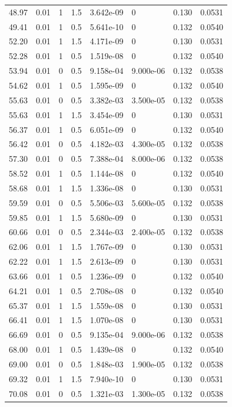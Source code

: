 \documentclass[preview]{standalone}
\begin{document}
{{{\begin{tabular}{L{1.2cm}C{1.2cm} C{0.3cm}C{0.5cm} C{1.4cm}C{1.4cm} C{1.4cm}C{1.4cm}}
  48.97  &  0.01  & 1     & 1.5 &  3.642e-09  & 0  & 0.130 &  0.0531   \\ 
  49.41  &  0.01  & 1     & 0.5 &  5.641e-10  & 0  & 0.132 &  0.0540   \\ 
  52.20  &  0.01  & 1     & 1.5 &  4.171e-09  & 0  & 0.130 &  0.0531   \\ 
  52.28  &  0.01  & 1     & 0.5 &  1.519e-08  & 0  & 0.132 &  0.0540   \\ 
  53.94  &  0.01  & 0     & 0.5 &  9.158e-04  & 9.000e-06  & 0.132 &  0.0538   \\ 
  54.62  &  0.01  & 1     & 0.5 &  1.595e-09  & 0  & 0.132 &  0.0540   \\ 
  55.63  &  0.01  & 0     & 0.5 &  3.382e-03  & 3.500e-05  & 0.132 &  0.0538   \\ 
  55.63  &  0.01  & 1     & 1.5 &  3.454e-09  & 0  & 0.130 &  0.0531   \\ 
  56.37  &  0.01  & 1     & 0.5 &  6.051e-09  & 0  & 0.132 &  0.0540   \\ 
  56.42  &  0.01  & 0     & 0.5 &  4.182e-03  & 4.300e-05  & 0.132 &  0.0538   \\ 
  57.30  &  0.01  & 0     & 0.5 &  7.388e-04  & 8.000e-06  & 0.132 &  0.0538   \\ 
  58.52  &  0.01  & 1     & 0.5 &  1.144e-08  & 0  & 0.132 &  0.0540   \\ 
  58.68  &  0.01  & 1     & 1.5 &  1.336e-08  & 0  & 0.130 &  0.0531   \\ 
  59.59  &  0.01  & 0     & 0.5 &  5.506e-03  & 5.600e-05  & 0.132 &  0.0538   \\ 
  59.85  &  0.01  & 1     & 1.5 &  5.680e-09  & 0  & 0.130 &  0.0531   \\ 
  60.66  &  0.01  & 0     & 0.5 &  2.344e-03  & 2.400e-05  & 0.132 &  0.0538   \\ 
  62.06  &  0.01  & 1     & 1.5 &  1.767e-09  & 0  & 0.130 &  0.0531   \\ 
  62.22  &  0.01  & 1     & 1.5 &  2.613e-09  & 0  & 0.130 &  0.0531   \\ 
  63.66  &  0.01  & 1     & 0.5 &  1.236e-09  & 0  & 0.132 &  0.0540   \\ 
  64.21  &  0.01  & 1     & 0.5 &  2.708e-08  & 0  & 0.132 &  0.0540   \\ 
  65.37  &  0.01  & 1     & 1.5 &  1.559e-08  & 0  & 0.130 &  0.0531   \\ 
  66.41  &  0.01  & 1     & 1.5 &  1.070e-08  & 0  & 0.130 &  0.0531   \\ 
  66.69  &  0.01  & 0     & 0.5 &  9.135e-04  & 9.000e-06  & 0.132 &  0.0538   \\ 
  68.00  &  0.01  & 1     & 0.5 &  1.439e-08  & 0  & 0.132 &  0.0540   \\ 
  69.00  &  0.01  & 0     & 0.5 &  1.848e-03  & 1.900e-05  & 0.132 &  0.0538   \\ 
  69.32  &  0.01  & 1     & 1.5 &  7.940e-10  & 0  & 0.130 &  0.0531   \\ 
  70.08  &  0.01  & 0     & 0.5 &  1.321e-03  & 1.300e-05  & 0.132 &  0.0538   \\ 
\hline 
\end{tabular} 

}}}
\end{document}

